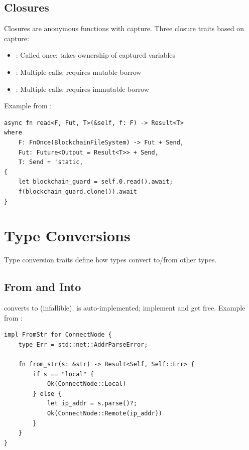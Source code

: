 \subsection{Closures}
\label{subsec:ch24-closures}

Closures are anonymous functions with capture. Three closure traits based on capture:
\begin{itemize}
  \item \textbf{}: Called once; takes ownership of captured variables
  \item \textbf{}: Multiple calls; requires mutable borrow
  \item \textbf{}: Multiple calls; requires immutable borrow
\end{itemize}

Example from :

\begin{listing}[htbp]
\caption{Closure traits in generic function}
\label{lst:ch24-closure}
\begin{verbatim}
async fn read<F, Fut, T>(&self, f: F) -> Result<T>
where
    F: FnOnce(BlockchainFileSystem) -> Fut + Send,
    Fut: Future<Output = Result<T>> + Send,
    T: Send + 'static,
{
    let blockchain_guard = self.0.read().await;
    f(blockchain_guard.clone()).await
}
\end{verbatim}
\end{listing}

\section{Type Conversions}
\label{sec:ch24-conversions}

Type conversion traits define how types convert to/from other types.

\subsection{From and Into}
\label{subsec:ch24-from-into}

 converts  to  (infallible).  is auto-implemented; implement  and get  free. Example from :

\begin{listing}[htbp]
\caption{FromStr implementation}
\label{lst:ch24-from-str}
\begin{verbatim}
impl FromStr for ConnectNode {
    type Err = std::net::AddrParseError;

    fn from_str(s: &str) -> Result<Self, Self::Err> {
        if s == "local" {
            Ok(ConnectNode::Local)
        } else {
            let ip_addr = s.parse()?;
            Ok(ConnectNode::Remote(ip_addr))
        }
    }
}
\end{verbatim}
\end{listing}

